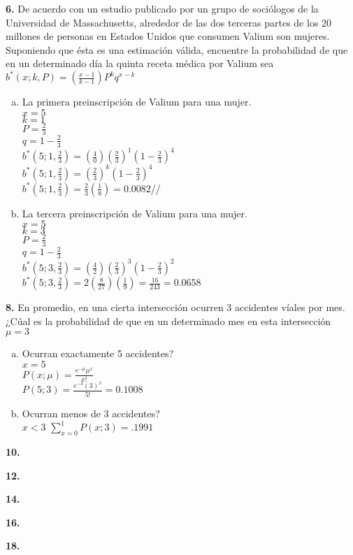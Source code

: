 \documentclass[12pt, letterpaper]{article}
\begin{document}
    \textbf{6. } De acuerdo con un estudio publicado por un grupo de sociólogos de la Universidad de Massachusetts, alrededor de las dos terceras partes de los 20 millones de personas en Estados Unidos que consumen Valium son mujeres. Suponiendo que ésta es una estimación válida, encuentre la probabilidad de que en un determinado día la quinta receta médica por Valium sea\\
$b^*(x;k,P)=\left( \frac{x-1}{k-1}\right) P^k q^{x-k}$\\    
    \begin{enumerate}[a)]
    	\item La primera preinscripción de Valium para una mujer.\\
    	$x=5$\\
    	$k=1$\\
    	$P=\frac{2}{3}$\\
    	$q=1-\frac{2}{3}$\\
    	$b^*(5;1,\frac{2}{3})=\left( \frac{4}{0}\right) \left( \frac{2}{3}\right)^1 \left( 1-\frac{2}{3}\right)^{4}$\\
    	$b^*(5;1,\frac{2}{3})=\left( \frac{2}{3}\right)^k \left( 1-\frac{2}{3}\right)^{4}$\\
    	$b^*(5;1,\frac{2}{3})=\frac{2}{3}\left(\frac{1}{8}\right)=0.0082$//
    	\item La tercera preinscripción de Valium para una mujer.\\
    	$x=5$\\
    	$k=3$\\
    	$P=\frac{2}{3}$\\
    	$q=1-\frac{2}{3}$\\
    	$b^*(5;3,\frac{2}{3})=\left( \frac{4}{2}\right) \left( \frac{2}{3}\right)^3 \left( 1-\frac{2}{3}\right)^{2}$\\
    	$b^*(5;3,\frac{2}{3})=2\left( \frac{8}{27}\right) \left( \frac{1}{9}\right)= \frac{16}{243}=0.0658$\\
    	
    	
    \end{enumerate}
    
    \vskip1cm

    \textbf{8. }En promedio, en una cierta intersección ocurren 3 accidentes víales por mes. ¿Cúal es la probabilidad de que en un determinado mes en esta intersección\\
	$\mu =3$\\    
    \begin{enumerate}[a)]
    \item Ocurran exactamente 5 accidentes?\\
	$x=5$\\    
    $P(x;\mu)= \frac{e^{-\mu}\mu ^x}{x!}$\\
    $P(5;3)= \frac{e^{-3}(3)^x}{5!}=0.1008$\\
    \item Ocurran menos de 3 accidentes?\\
    $x<3$
    $\sum^1_{x=0} P(x;3)=.1991$
    
    \end{enumerate}
    
    \vskip1cm

    \textbf{10. }\vskip1cm

    \textbf{12. }\vskip1cm

    \textbf{14. }\vskip1cm

    \textbf{16. }\vskip1cm

    \textbf{18. }\vskip1cm
\end{document}
